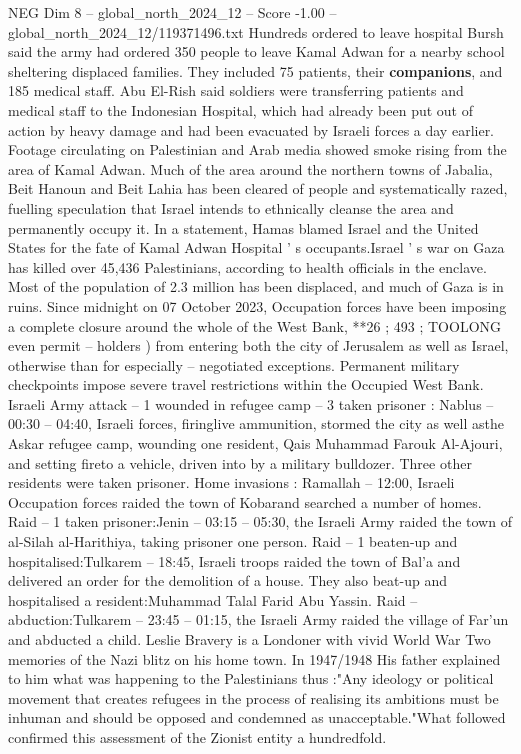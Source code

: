 \begin{textsample}{NEG Dim 8 – global\_north\_2024\_12 – Score -1.00 – global\_north\_2024\_12/119371496.txt}
Hundreds ordered to leave hospital Bursh said the army had ordered 350 people to leave Kamal Adwan for a nearby school sheltering displaced families.
They included 75 patients, their \textbf{companions}, and 185 medical staff.
Abu El-Rish said soldiers were transferring patients and medical staff to the Indonesian Hospital, which had already been put out of action by heavy damage and had been evacuated by Israeli forces a day earlier.
Footage circulating on Palestinian and Arab media showed smoke rising from the area of Kamal Adwan.
Much of the area around the northern towns of Jabalia, Beit Hanoun and Beit Lahia has been cleared of people and systematically razed, fuelling speculation that Israel intends to ethnically cleanse the area and permanently occupy it.
In a statement, Hamas blamed Israel and the United States for the fate of Kamal Adwan Hospital ' s occupants.Israel ' s war on Gaza has killed over 45,436 Palestinians, according to health officials in the enclave.
Most of the population of 2.3 million has been displaced, and much of Gaza is in ruins.
Since midnight on 07 October 2023, Occupation forces have been imposing a complete closure around the whole of the West Bank, **26 ; 493 ; TOOLONG even permit -- holders ) from entering both the city of Jerusalem as well as Israel, otherwise than for especially -- negotiated exceptions.
Permanent military checkpoints impose severe travel restrictions within the Occupied West Bank.
Israeli Army attack -- 1 wounded in refugee camp -- 3 taken prisoner : Nablus -- 00:30 -- 04:40, Israeli forces, firinglive ammunition, stormed the city as well asthe Askar refugee camp, wounding one resident, Qais Muhammad Farouk Al-Ajouri, and setting fireto a vehicle, driven into by a military bulldozer.
Three other residents were taken prisoner.
Home invasions : Ramallah -- 12:00, Israeli Occupation forces raided the town of Kobarand searched a number of homes.
Raid -- 1 taken prisoner:Jenin -- 03:15 -- 05:30, the Israeli Army raided the town of al-Silah al-Harithiya, taking prisoner one person.
Raid -- 1 beaten-up and hospitalised:Tulkarem -- 18:45, Israeli troops raided the town of Bal'a and delivered an order for the demolition of a house.
They also beat-up and hospitalised a resident:Muhammad Talal Farid Abu Yassin.
Raid -- abduction:Tulkarem -- 23:45 -- 01:15, the Israeli Army raided the village of Far'un and abducted a child.
Leslie Bravery is a Londoner with vivid World War Two memories of the Nazi blitz on his home town.
In 1947/1948 His father explained to him what was happening to the Palestinians thus :"Any ideology or political movement that creates refugees in the process of realising its ambitions must be inhuman and should be opposed and condemned as unacceptable."What followed confirmed this assessment of the Zionist entity a hundredfold.

\end{textsample}
